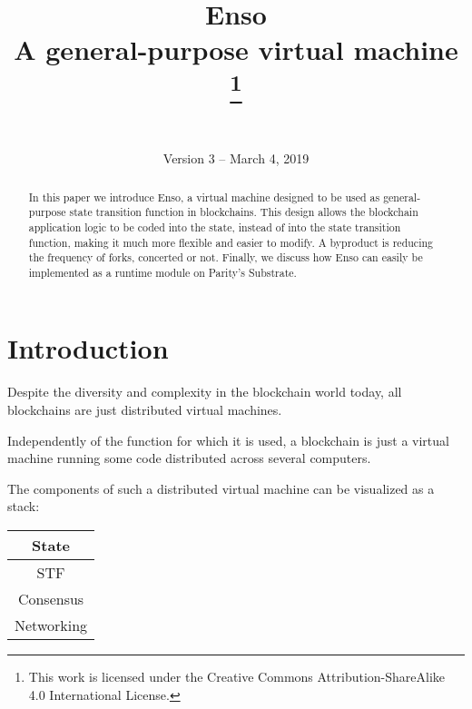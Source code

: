 \documentclass[conference]{IEEEtran}
\begin{document}
\title{Enso\\
	\large A general-purpose virtual machine
	\thanks{This work is licensed under the Creative Commons Attribution-ShareAlike 4.0 International License.}
}

\author{
	\\\\Version 3 -- March 4, 2019
}

\maketitle
\thispagestyle{plain} %
\pagestyle{plain} %

\begin{abstract}
In this paper we introduce Enso, a virtual machine designed to be used as general-purpose state transition function in blockchains. This design allows the blockchain application logic to be coded into the state, instead of into the state transition function, making it much more flexible and easier to modify. A byproduct is reducing the frequency of forks, concerted or not. Finally, we discuss how Enso can easily be implemented as a runtime module on Parity's Substrate.
\end{abstract}

\section{Introduction}
Despite the diversity and complexity in the blockchain world today, all blockchains are just distributed virtual machines.

Independently of the function for which it is used, a blockchain is just a virtual machine running some code distributed across several computers.

The components of such a distributed virtual machine can be visualized as a stack:

\begin{center}
	\begin{tabular}{c}
		State\\
		\hline
		STF\\
		\hline
		Consensus\\
		\hline
		Networking
	\end{tabular}
\end{center}
\end{document}

